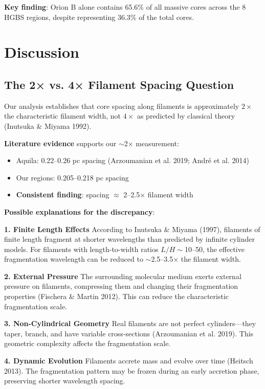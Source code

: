 \documentclass[11pt,a4paper]{article}
\begin{document}
\noindent\textbf{Key finding}: Orion B alone contains 65.6\% of all massive cores across the 8 HGBS regions, despite representing 36.3\% of the total cores.

\section{Discussion}

\subsection{The 2× vs. 4× Filament Spacing Question}

Our analysis establishes that core spacing along filaments is approximately $2\times$ the characteristic filament width, not $4\times$ as predicted by classical theory (Inutsuka \& Miyama 1992).

\textbf{Literature evidence} supports our $\sim$2× measurement:
\begin{itemize}
    \item Aquila: 0.22--0.26 pc spacing (Arzoumanian et al. 2019; André et al. 2014)
    \item Our regions: 0.205--0.218 pc spacing
    \item \textbf{Consistent finding}: spacing $\approx$ 2--2.5× filament width
\end{itemize}

\textbf{Possible explanations for the discrepancy}:

\textbf{1. Finite Length Effects}
According to Inutsuka \& Miyama (1997), filaments of finite length fragment at shorter wavelengths than predicted by infinite cylinder models. For filaments with length-to-width ratios $L/H \sim$10--50, the effective fragmentation wavelength can be reduced to $\sim$2.5--3.5× the filament width.

\textbf{2. External Pressure}
The surrounding molecular medium exerts external pressure on filaments, compressing them and changing their fragmentation properties (Fischera \& Martin 2012). This can reduce the characteristic fragmentation scale.

\textbf{3. Non-Cylindrical Geometry}
Real filaments are not perfect cylinders---they taper, branch, and have variable cross-sections (Arzoumanian et al. 2019). This geometric complexity affects the fragmentation scale.

\textbf{4. Dynamic Evolution}
Filaments accrete mass and evolve over time (Heitsch 2013). The fragmentation pattern may be frozen during an early accretion phase, preserving shorter wavelength spacing.
\end{document}
